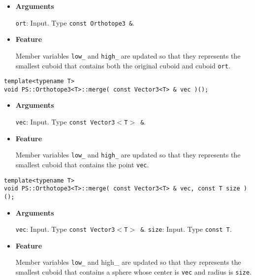 \begin{itemize}

\item{{\bf Arguments}}

\texttt{ort}: Input. Type \texttt{const Orthotope3 \&}.

\item{{\bf Feature}}

Member variables \texttt{low\_} and \texttt{high\_} are updated so that they represents the smallest cuboid that contains both the original cuboid and cuboid \texttt{ort}.

\end{itemize}
\begin{screen}
\begin{verbatim}
template<typename T>
void PS::Orthotope3<T>::merge( const Vector3<T> & vec )();
\end{verbatim}
\end{screen}

\begin{itemize}

\item{{\bf Arguments}}

\texttt{vec}: Input. Type \texttt{const Vector3$<$T$>$ \&}.

\item{{\bf Feature}}

Member variables \texttt{low\_} and \texttt{high\_} are updated so that they represents the smallest cuboid that contains the point \texttt{vec}.

\end{itemize}
\begin{screen}
\begin{verbatim}
template<typename T>
void PS::Orthotope3<T>::merge( const Vector3<T> & vec, const T size )();
\end{verbatim}
\end{screen}

\begin{itemize}

\item{{\bf Arguments}}

\texttt{vec}: Input. Type \texttt{const Vector3$<$T$>$ \&}.
\texttt{size}: Input. Type \texttt{const T}.

\item{{\bf Feature}}

Member variables \texttt{low\_} and {high\_} are updated so that they represents the smallest cuboid that contains a sphere whose center is \texttt{vec} and radius is \texttt{size}.

\end{itemize}

